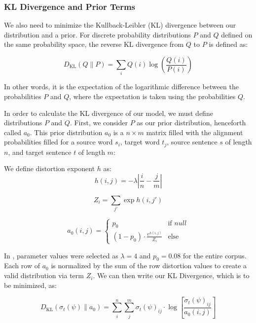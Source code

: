 \documentclass[twoside,twocolumn]{article}
\begin{document}
\subsubsection{KL Divergence and Prior Terms}

We also need to minimize the Kullback-Leibler (KL) divergence between our
distribution and a prior. For discrete probability distributions $P$ and $Q$
defined on the same probability space, the reverse KL divergence from $Q$ to
$P$ is defined as:

\begin{equation}
D_{\mathrm{KL}}(Q \| P) = \sum_{i} Q(i) \log \left( \frac{Q(i)}{P(i)} \right)
\end{equation}

In other words, it is the expectation of the logarithmic difference between the
probabilities $P$ and $Q$, where the expectation is taken using the
probabilities $Q$.

In order to calculate the KL divergence of our model, we must define
distributions $P$ and $Q$. First, we consider $P$ as our prior
distribution, henceforth called $a_0$. This prior distribution $a_0$ is a
$n \times m$ matrix filled with the alignment probabilities filled for a source
word $s_i$, target word $t_j$, source sentence $s$ of length $n$, and target
sentence $t$ of length $m$:

We define distortion exponent $h$ as:
\begin{equation}
  h(i, j) = {-\lambda \left| \frac{i}{n} - \frac{j}{m}\right|}
\end{equation}

\begin{equation}
  Z_i = \sum_{j'} \exp h(i, j')
\end{equation}

\begin{equation}
a_0 (i, j) =
\begin{cases}
      p_0 & \text{if } null \\
     (1-p_0) \cdot \frac{e^{h(i,j)}}{Z_i} & \text{else}
   \end{cases}
\end{equation}

In \cite{dyer2013simple}, parameter values were selected as $\lambda=4$ and $p_0=0.08$
for the entire corpus. Each row of $a_0$ is normalized by the sum of the row
distortion values to create a valid distribution via term $Z_i$.
We can then write our KL Divergence, which is to be minimized, as:

\begin{equation}
  D_{\mathrm{KL}}(\sigma_t(\psi) \| a_0) =
    \sum_i^n \sum_j^m \sigma_t(\psi)_{ij} \cdot
      \log \left[ \frac{\sigma_t(\psi)_{ij}}{a_0(i, j)} \right]
\end{equation}
\end{document}
